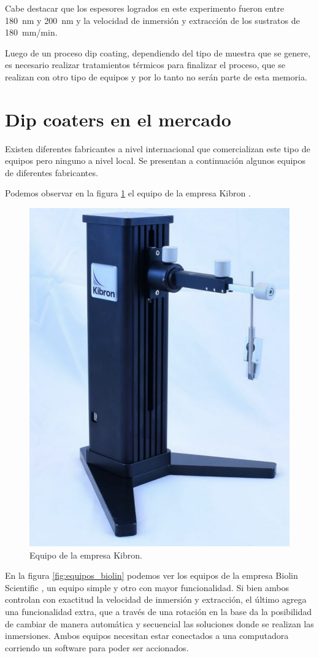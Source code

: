 

Cabe destacar que los espesores logrados en este experimento fueron entre \SI{180}{nm} y \SI{200}{nm} y la velocidad de inmersión y extracción de los sustratos de \SI{180}{mm/min}.

Luego de un proceso dip coating, dependiendo del tipo de muestra que se genere, es necesario realizar tratamientos térmicos para finalizar el proceso, que se realizan con otro tipo de equipos y por lo tanto no serán parte de esta memoria.
 
\label{sec:dip coating}

\section{Dip coaters en el mercado}

Existen diferentes fabricantes a nivel internacional que comercializan este tipo de equipos pero ninguno a nivel local. Se presentan a continuación algunos equipos de diferentes fabricantes. 

Podemos observar en la figura \ref{fig:dip_kibron} el equipo de la empresa Kibron \citep{2_web_kibron}.

\begin{figure}[htbp]
	\centering
	\includegraphics[width=.25\textwidth]{./Figures/kibron.pdf}
	\caption{Equipo de la empresa Kibron.}
	\label{fig:dip_kibron}
\end{figure}

En la figura \ref{fig:equipos_biolin} podemos ver los equipos de la empresa Biolin Scientific  \citep{1_web_biolin}, un equipo simple y otro con mayor funcionalidad. Si bien ambos controlan con exactitud la velocidad de inmersión y extracción, el último agrega una funcionalidad extra, que a través de una rotación en la base da la posibilidad de cambiar de manera automática y secuencial las soluciones donde se realizan las inmersiones. Ambos equipos necesitan estar conectados a una computadora corriendo un software para poder ser accionados.

